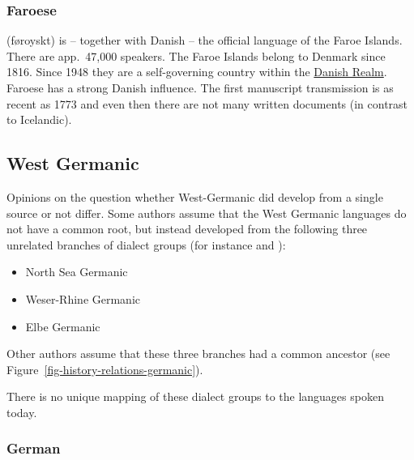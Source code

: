 \subsubsection{Faroese}

 (føroyskt) is -- together with Danish -- the official language of the Faroe Islands. There
are app.\ 47,000 speakers. The Faroe Islands belong to Denmark since 1816. Since 1948 they are a
self-governing country within the \href{https://en.wikipedia.org/wiki/Danish_Realm}{Danish Realm}.
Faroese has a strong Danish influence. The first manuscript transmission is as recent as 1773 and
even then there are not many written documents (in contrast to Icelandic).


\subsection{West Germanic}


Opinions on the question whether West-Germanic did develop from a single source or not differ. Some authors
assume that the West Germanic languages do not have a common root, but instead developed from the
following three unrelated branches of dialect groups (for instance \citealp[--18]{Robinson1992a-u} and
\citealp[]{HvDA94a}):
\begin{itemize}
\item North Sea Germanic %
\item Weser-Rhine Germanic %
\item Elbe Germanic %
\end{itemize}
Other authors assume that these three branches had a common ancestor (see Figure~\ref{fig-history-relations-germanic}).

There is no unique mapping of these dialect groups to the languages spoken today.





\subsubsection{German}

